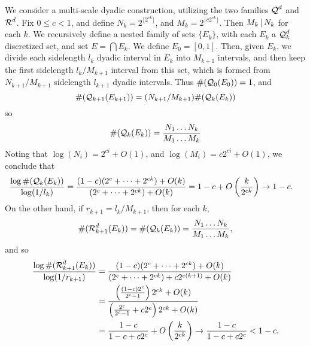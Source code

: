 \begin{example}
	We consider a multi-scale dyadic construction, utilizing the two families $\operatorname{\mathcal{Q}}^d$ and $\operatorname{\mathcal{R}}^d$. Fix $0 \leq c < 1$, and define $N_k = 2^{\lfloor 2^{ck} \rfloor}$, and $M_k = 2^{\lfloor c 2^{ck} \rfloor}$. Then $M_k \operatorname{\mid} N_k$ for each $k$. We recursively define a nested family of sets $\{ E_k \}$, with each $E_k$ a $\operatorname{\mathcal{Q}}_k^d$ discretized set, and set $E = \bigcap E_k$. We define $E_0 = [0,1]$. Then, given $E_k$, we divide each sidelength $l_k$ dyadic interval in $E_k$ into $M_{k+1}$ intervals, and then keep the first sidelength $l_k/M_{k+1}$ interval from this set, which is formed from $N_{k+1}/M_{k+1}$ sidelength $l_{k+1}$ dyadic intervals. Thus $\#(\operatorname{\mathcal{Q}}_0(E_0)) = 1$, and
	\[ \#(\operatorname{\mathcal{Q}}_{k+1}(E_{k+1})) = (N_{k+1}/M_{k+1}) \#(\operatorname{\mathcal{Q}}_k(E_k)) \]
	so
	\begin{equation} \label{equation12623} \#(\operatorname{\mathcal{Q}}_k(E_k)) = \frac{N_1 \dots N_k}{M_1 \dots M_k} \end{equation}
	Noting that $\log(N_i) = 2^{ci} + O(1)$, and $\log(M_i) = c2^{ci} + O(1)$, we conclude that
	\begin{align*}
		\frac{\log \#(\operatorname{\mathcal{Q}}_k(E_k))}{\log(1/l_k)} &= \frac{(1-c)(2^c + \dots + 2^{ck}) + O(k)}{(2^c + \dots + 2^{ck}) + O(k)} = 1-c + O\left(\frac{k}{2^{ck}} \right) \to 1-c.
	\end{align*}
	On the other hand, if $r_{k+1} = l_k/M_{k+1}$, then for each $k$,
	\[ \#(\operatorname{\mathcal{R}}_{k+1}^d(E_k)) = \#(\operatorname{\mathcal{Q}}_k(E_k)) = \frac{N_1 \dots N_k}{M_1 \dots M_k}, \]
	and so
	\begin{align*}
		\frac{\log \#(\operatorname{\mathcal{R}}_{k+1}^d(E_k))}{\log(1/r_{k+1})} &= \frac{(1-c)(2^c + \dots + 2^{ck}) + O(k)}{(2^c + \dots + 2^{ck}) + c2^{c(k+1)} + O(k)} \\
		&= \frac{\left( \frac{(1-c) 2^c}{2^c - 1} \right) 2^{ck} + O(k)}{ \left( \frac{2^c}{2^c - 1} + c2^c \right) 2^{ck} + O(k)}\\
		&= \frac{1-c}{1 - c + c2^c} + O \left( \frac{k}{2^{ck}} \right) \to \frac{1 - c}{1 - c + c2^c} < 1 - c.
	\end{align*}
%
%

\end{example}

